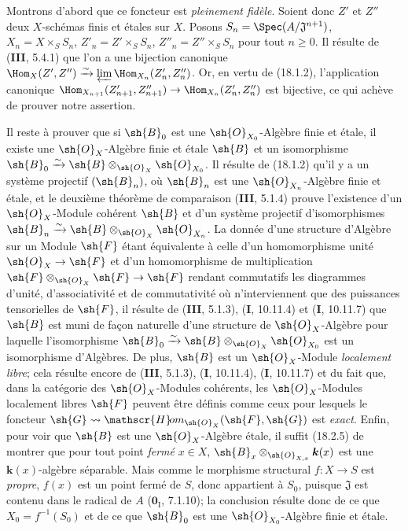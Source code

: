 Montrons d'abord que ce foncteur est \emph{pleinement fidèle}. Soient donc $Z'$ et $Z''$ deux $X$-schémas finis et étales sur $X$. Posons $S_n=\Spec(A/\mathfrak J^{n+1})$, $X_n=X\times_S S_n$, $Z'_n=Z'\times_S S_n$, $Z''_n=Z''\times_S S_n$ pour tout $n\geq 0$. Il résulte de (\textbf{III}, 5.4.1) que l'on a une bijection canonique $\Hom_X(Z',Z'')\xrightarrow{\sim}\varprojlim\Hom_{X_n}(Z'_n,Z''_n)$. Or, en vertu de (18.1.2), l'application canonique $\Hom_{X_{n+1}}(Z'_{n+1},Z''_{n+1})\to\Hom_{X_n}(Z'_n,Z''_n)$ est bijective, ce qui achève de prouver notre assertion.

Il reste à prouver que si $\sh{B}_0$ est une $\sh{O}_{X_0}$-Algèbre finie et étale, il existe une $\sh{O}_X$-Algèbre finie et étale $\sh{B}$ et un isomorphisme $\sh{B}_0\xrightarrow{\sim}\sh{B}\otimes_{\sh{O}_X}\sh{O}_{X_0}$. Il résulte de (18.1.2) qu'il y a un système projectif $(\sh{B}_n)$, où $\sh{B}_n$ est une $\sh{O}_{X_n}$-Algèbre finie et étale, et le deuxième théorème de comparaison (\textbf{III}, 5.1.4) prouve l'existence d'un $\sh{O}_X$-Module cohérent $\sh{B}$ et d'un système projectif d'isomorphismes $\sh{B}_n\xrightarrow{\sim}\sh{B}\otimes_{\sh{O}_X}\sh{O}_{X_n}$. La donnée d'une structure d'Algèbre sur un Module $\sh{F}$ étant équivalente à celle d'un homomorphisme unité $\sh{O}_X\to\sh{F}$ et d'un homomorphisme de multiplication $\sh{F}\otimes_{\sh{O}_X}\sh{F}\to\sh{F}$ rendant commutatifs les diagrammes d'unité, d'associativité et de commutativité où n'interviennent que des puissances tensorielles de $\sh{F}$, il résulte de (\textbf{III}, 5.1.3), (\textbf{I}, 10.11.4) et (\textbf{I}, 10.11.7) que $\sh{B}$ est muni de façon naturelle d'une structure de $\sh{O}_X$-Algèbre pour laquelle l'isomorphisme $\sh{B}_0\xrightarrow{\sim}\sh{B}\otimes_{\sh{O}_X}\sh{O}_{X_0}$ est un isomorphisme d'Algèbres. De plus, $\sh{B}$ est un $\sh{O}_X$-Module \emph{localement libre}; cela résulte encore de (\textbf{III}, 5.1.3), (\textbf{I}, 10.11.4), (\textbf{I}, 10.11.7) et du fait que, dans la catégorie des $\sh{O}_X$-Modules cohérents, les $\sh{O}_X$-Modules localement libres $\sh{F}$ peuvent être définis comme ceux pour lesquels le foncteur $\sh{G}\leadsto\mathscr{H}\!om_{\sh{O}_X}(\sh{F},\sh{G})$ est \emph{exact}. Enfin, pour voir que $\sh{B}$ est une $\sh{O}_X$-Algèbre étale, il suffit (18.2.5) de montrer que pour tout point \emph{fermé} $x\in X$, $\sh{B}_x\otimes_{\sh{O}_{X,x}}\boldsymbol{k}(x)$ est une $\boldsymbol{k}(x)$-algèbre séparable. Mais comme le morphisme structural $f:X\to S$ est \emph{propre}, $f(x)$ est un point fermé de $S$, donc appartient à $S_0$, puisque $\mathfrak J$ est contenu dans le radical de $A$ ($\mathbf{0}_{\mathrm I}$, 7.1.10); la conclusion résulte donc de ce que $X_0=f^{-1}(S_0)$ et de ce que $\sh{B}_0$ est une $\sh{O}_{X_0}$-Algèbre finie et étale.

